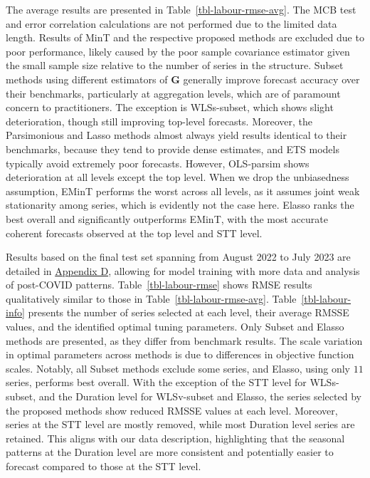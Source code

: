 \documentclass[
  11pt]{article}
\theoremstyle{plain}
\theoremstyle{remark}
\begin{document}
The average results are presented in Table~\ref{tbl-labour-rmse-avg}.
The MCB test and error correlation calculations are not performed due to
the limited data length. Results of MinT and the respective proposed
methods are excluded due to poor performance, likely caused by the poor
sample covariance estimator given the small sample size relative to the
number of series in the structure. Subset methods using different
estimators of \(\bm{G}\) generally improve forecast accuracy over their
benchmarks, particularly at aggregation levels, which are of paramount
concern to practitioners. The exception is WLSs-subset, which shows
slight deterioration, though still improving top-level forecasts.
Moreover, the Parsimonious and Lasso methods almost always yield results
identical to their benchmarks, because they tend to provide dense
estimates, and ETS models typically avoid extremely poor forecasts.
However, OLS-parsim shows deterioration at all levels except the top
level. When we drop the unbiasedness assumption, EMinT performs the
worst across all levels, as it assumes joint weak stationarity among
series, which is evidently not the case here. Elasso ranks the best
overall and significantly outperforms EMinT, with the most accurate
coherent forecasts observed at the top level and STT level.

Results based on the final test set spanning from August 2022 to July
2023 are detailed in \hyperref[appendix-labour]{Appendix D}, allowing
for model training with more data and analysis of post-COVID patterns.
Table~\ref{tbl-labour-rmse} shows RMSE results qualitatively similar to
those in Table~\ref{tbl-labour-rmse-avg}. Table~\ref{tbl-labour-info}
presents the number of series selected at each level, their average
RMSSE values, and the identified optimal tuning parameters. Only Subset
and Elasso methods are presented, as they differ from benchmark results.
The scale variation in optimal parameters across methods is due to
differences in objective function scales. Notably, all Subset methods
exclude some series, and Elasso, using only \(11\) series, performs best
overall. With the exception of the STT level for WLSs-subset, and the
Duration level for WLSv-subset and Elasso, the series selected by the
proposed methods show reduced RMSSE values at each level. Moreover,
series at the STT level are mostly removed, while most Duration level
series are retained. This aligns with our data description, highlighting
that the seasonal patterns at the Duration level are more consistent and
potentially easier to forecast compared to those at the STT level.
\end{document}
